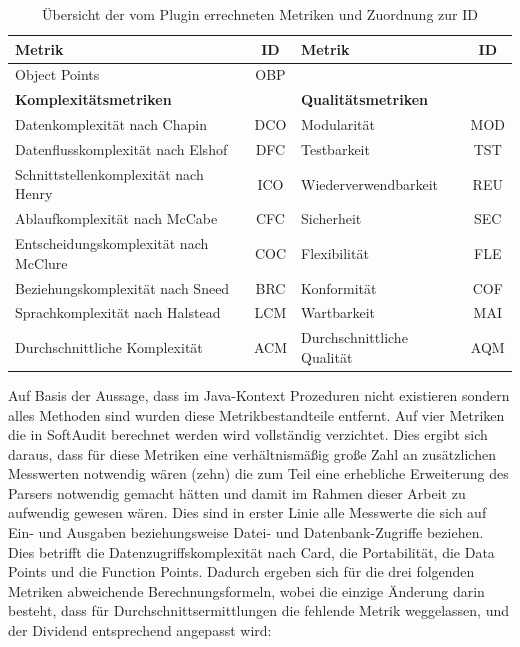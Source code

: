 \documentclass[gb,ngerman]{stthesis}
\begin{document}
			\begin{table} [h]
				\centering
				\tabulinesep=1.5mm
				\begin{tabu}{|l|c||l|c|}
					\hline
  					\textbf{Metrik} & \textbf{ID} & \textbf{Metrik} & \textbf{ID} \\
  					\hline
    				Object Points & OBP & & \\
    				\hline
    				\textbf{Komplexitätsmetriken} & & \textbf{Qualitätsmetriken} & \\
    				\hline
    				Datenkomplexität nach Chapin & DCO & Modularität & MOD \\
    				\hline
    				Datenflusskomplexität nach Elshof & DFC & Testbarkeit & TST \\
    				\hline
    				Schnittstellenkomplexität nach Henry & ICO & Wiederverwendbarkeit & REU \\
    				\hline
    				Ablaufkomplexität nach McCabe & CFC & Sicherheit & SEC \\
    				\hline
    				Entscheidungskomplexität nach McClure & COC & Flexibilität & FLE \\
    				\hline
    				Beziehungskomplexität nach Sneed & BRC & Konformität & COF \\
    				\hline
    				Sprachkomplexität nach Halstead & LCM & Wartbarkeit & MAI \\
    				\hline
    				Durchschnittliche Komplexität & ACM & Durchschnittliche Qualität & AQM \\
    				\hline
  				\end{tabu}
  				\caption{Übersicht der vom Plugin errechneten Metriken und Zuordnung zur  ID}
					\label{metriken}   
  			\end{table}
  			\newline
  			Auf Basis der Aussage, dass im Java-Kontext Prozeduren nicht existieren sondern alles Methoden sind wurden diese Metrikbestandteile entfernt. Auf vier Metriken die in SoftAudit berechnet werden wird vollständig verzichtet. Dies ergibt sich daraus, dass für diese Metriken eine verhältnismäßig große Zahl an zusätzlichen Messwerten notwendig wären (zehn) die zum Teil eine erhebliche Erweiterung des Parsers notwendig gemacht hätten und damit im Rahmen dieser Arbeit zu aufwendig gewesen wären. Dies sind in erster Linie alle Messwerte die sich auf Ein- und Ausgaben beziehungsweise Datei- und Datenbank-Zugriffe beziehen. Dies betrifft die Datenzugriffskomplexität nach Card, die Portabilität, die Data Points und die Function Points. Dadurch ergeben sich für die drei folgenden Metriken abweichende Berechnungsformeln, wobei die einzige Änderung darin besteht, dass für Durchschnittsermittlungen die fehlende Metrik weggelassen, und der Dividend entsprechend angepasst wird: 
\end{document}
